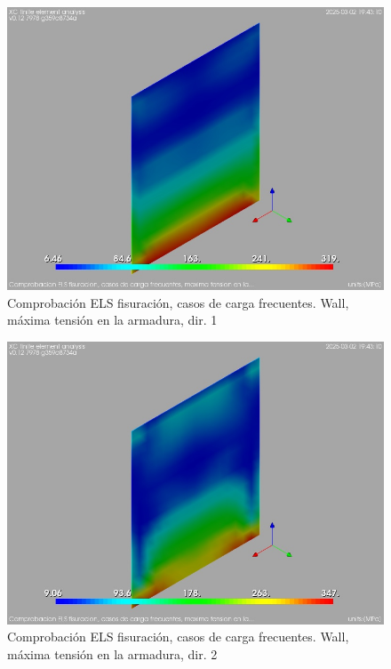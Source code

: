 \begin{figure}[ht]
\begin{center}
\includegraphics[width=\linewidth]{results/graphics/crackingSLS_freq/wallsigma_sSect1}
\caption{Comprobación ELS fisuración, casos de carga frecuentes. Wall, máxima tensión en la armadura, dir. 1}
\label{SLS_frequentLoadsCrackControlwallsigma_sSect1}
\end{center}
\end{figure}
\begin{figure}[ht]
\begin{center}
\includegraphics[width=\linewidth]{results/graphics/crackingSLS_freq/wallsigma_sSect2}
\caption{Comprobación ELS fisuración, casos de carga frecuentes. Wall, máxima tensión en la armadura, dir. 2}
\label{SLS_frequentLoadsCrackControlwallsigma_sSect2}
\end{center}
\end{figure}
